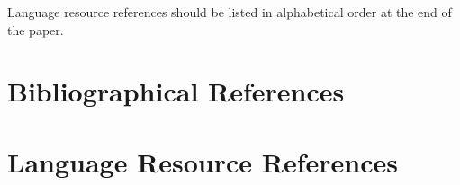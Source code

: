 \documentclass[10pt, a4paper]{article}
\begin{document}
Language resource references should be listed in alphabetical order at the end of the paper.

\nocite{Eco:1990,Martin-90,Chercheur-94,CastorPollux-92,bs-2570-manual,bs-2570-techreport,chomsky-73,hoel-71-portion,hoel-71-whole,singer-whole,Jespersen:1922,Superman-Batman-Catwoman-Spiderman-00}
\section{Bibliographical References}\label{sec:reference}




\section{Language Resource References}
\label{lr:ref}
\end{document}
